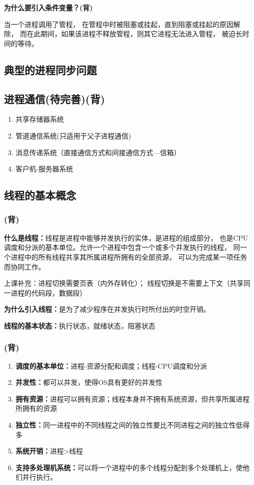 \documentclass{article}
\begin{document}
\noindent\textbf{为什么要引入条件变量？{\color{green}(背)}}

当一个进程调用了管程，
在管程中时被阻塞或挂起，直到阻塞或挂起的原因解除，
而在此期间，如果该进程不释放管程，则其它进程无法进入管程，
被迫长时间的等待。
\vspace*{-0.3cm}
\subsection{{\color{gray}典型的进程同步问题}}
\vspace*{-0.2cm}
\subsection{{\color{red}进程通信(待完善)}{\color{green}(背)}}
\begin{enumerate}
    \item 共享存储器系统
    \item 管道通信系统(只适用于父子进程通信)
    \item 消息传递系统（直接通信方式和间接通信方式—信箱）
    \item 客户机-服务器系统
\end{enumerate}

\subsection{线程的基本概念}
\subsubsection{{\color{red}{线程的引入}}{\color{green}(背)}}
\textbf{什么是线程：}线程是进程中能够并发执行的实体，是进程的组成部分，
也是CPU调度和分派的基本单位。允许一个进程中包含一个或多个并发执行的线程，
同一个进程中的所有线程共享其所属进程所拥有的全部资源，
可以为完成某一项任务而协同工作。

上课补充：进程切换需要页表（内外存转化）；
线程切换是不需要上下文（共享同一进程的代码段，数据段）

\textbf{为什么引入线程：}是为了减少程序在并发执行时所付出的时空开销。

\textbf{线程的基本状态：}执行状态，就绪状态，阻塞状态
\subsubsection{{\color{red}{进程和线程的比较}}{\color{green}(背)}}
    \begin{enumerate}
        \item \textbf{调度的基本单位：}进程-资源分配和调度；线程-CPU调度和分派
        \item \textbf{并发性：}都可以并发，使得OS具有更好的并发性
        \item \textbf{拥有资源：}进程可以拥有资源；线程本身并不拥有系统资源，但共享所属进程所拥有的资源
        \item \textbf{独立性：}同一进程中的不同线程之间的独立性要比不同进程之间的独立性低得多
        \item \textbf{系统开销：}进程>线程
        \item \textbf{支持多处理机系统：}可以将一个进程中的多个线程分配到多个处理机上，使他们并行执行。
    \end{enumerate}    
\end{document}
